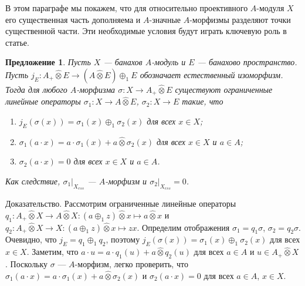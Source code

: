 \documentclass[12pt]{article}
\numberwithin{equation}{subsection}
\theoremstyle{plain}
\newtheorem{proposition}{Предложение}
\newenvironment{proof}{Доказательство.}{}
\newcommand{\projtens}{\mathbin{\widehat{\otimes}}}
\begin{document}
\begin{fulltext}
    В этом параграфе мы покажем, что для относительно проективного $A$-модуля
    $X$ его существенная часть дополняема и $A$-значные $A$-морфизмы разделяют
    точки существенной части. Эти необходимые условия будут играть ключевую роль
    в статье.

    \begin{proposition}\label{MorphDecomp} Пусть $X$ --- банахов $A$-модуль и
        $E$ --- банахово пространство. Пусть $j_E:A_+\projtens E\to (A\projtens
            E)\oplus_1 E$ обозначает естественный изоморфизм. Тогда для любого
        $A$-морфизма $\sigma:X\to A_+\projtens E$ существуют ограниченные
        линейные операторы $\sigma_1:X\to A\projtens E$, $\sigma_2:X\to E$
        такие, что
        \begin{enumerate}[label = (\roman*)]
            \item $j_E(\sigma(x))=\sigma_1(x)\oplus_1 \sigma_2(x)$ для всех
                  $x\in X$;

            \item $\sigma_1(a\cdot x)=a\cdot \sigma_1(x)+a\projtens \sigma_2(x)$
                  для всех $x\in X$ и $a\in A$;

            \item $\sigma_2(a\cdot x)=0$ для всех $x\in X$ и $a\in A$.
        \end{enumerate}

        \noindent
        Как следствие, $\sigma_1|_{X_{ess}}$ --- $A$-морфизм и
        $\sigma_2|_{X_{ess}}=0$.

    \end{proposition}
    \begin{proof} Рассмотрим ограниченные линейные операторы $q_1:A_+\projtens
            X\to A\projtens X: (a\oplus_1 z)\projtens x\mapsto a\projtens x$ и
        $q_2:A_+\projtens X\to X: (a\oplus_1 z)\projtens x\mapsto z x$.
        Определим отображения $\sigma_1=q_1\sigma$, $\sigma_2=q_2\sigma$.
        Очевидно, что $j_E=q_1\oplus_1 q_2$, поэтому
        $j_E(\sigma(x))=\sigma_1(x)\oplus_1 \sigma_2(x)$ для всех $x\in X$.
        Заметим, что $a\cdot u=a\cdot q_1(u)+a\projtens q_2(u)$ для всех
        $a\in A$ и $u\in A_+\projtens X$. Поскольку $\sigma$ ---
        $A$-морфизм, легко проверить, что $\sigma_1(a\cdot x)=a\cdot
            \sigma_1(x)+a\projtens \sigma_2(x)$ и $\sigma_2(a\cdot x)=0$ для
        всех $a\in A$, $x\in X$.
    \end{proof}


\end{fulltext}
\end{document}
